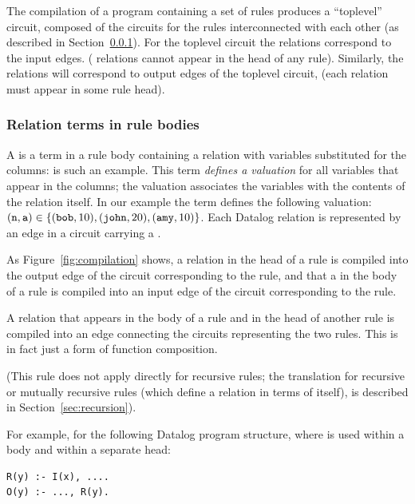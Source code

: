 The compilation of a program containing a set of rules produces a ``toplevel'' circuit,
composed of the circuits for the rules interconnected with each other (as described
in Section~\ref{sec:connections}).
For the toplevel circuit the  relations correspond to the input 
edges.  ( relations cannot appear in the head of any rule).  Similarly,
the  relations will correspond to output edges of the toplevel circuit,
(each  relation must appear in some rule head).

\subsubsection{Relation terms in rule bodies}\label{sec:connections}

A  is a term in a rule body containing a relation with variables substituted 
for the columns:  is such an example.
This term \emph{defines a valuation} for all variables that appear in the columns; 
the valuation associates the variables with the contents of the relation itself.  In our example
the term  defines the following valuation:
$(\mbox{\texttt{n}}, \mbox{\texttt{a}}) \in \{ (\mbox{\texttt{bob}}, 10), (\mbox{\texttt{john}}, 20), (\mbox{\texttt{amy}}, 10) \}$.
Each Datalog relation is represented by an edge in a circuit
carrying a \zr.  

As Figure~\ref{fig:compilation} shows, a relation in the head of a rule is compiled into the  
output edge of the circuit corresponding to the rule, and that a 
in the body of a rule is compiled into an input edge of the circuit
corresponding to the rule.

A relation that appears in the body of a rule and in the head of another
rule is compiled into an edge connecting the circuits representing the two rules.
This is in fact just a form of function composition.

(This rule does not apply directly for recursive rules; the translation for recursive
or mutually recursive rules (which define a relation
in terms of itself), is described in Section~\ref{sec:recursion}).

For example, for the following Datalog program structure, where  is used
within a body and within a separate head:

\begin{lstlisting}[language=ddlog]
R(y) :- I(x), ....
O(y) :- ..., R(y).
\end{lstlisting}

